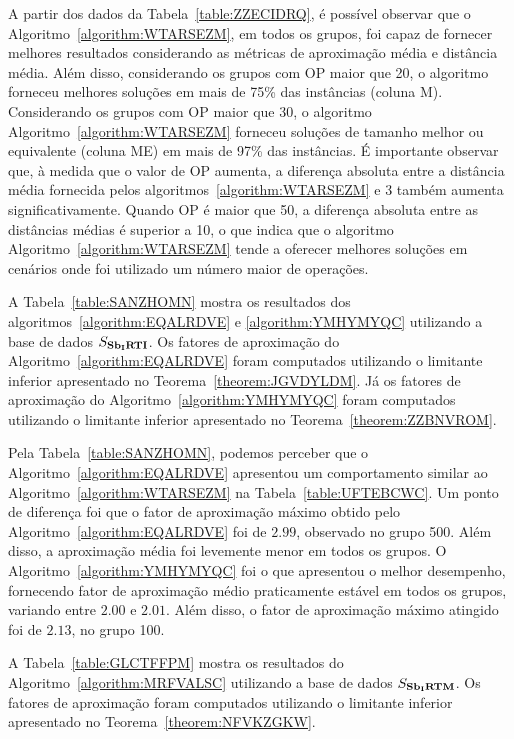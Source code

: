 

A partir dos dados da Tabela~\ref{table:ZZECIDRQ}, é possível observar que o Algoritmo~\ref{algorithm:WTARSEZM}, em todos os grupos, foi capaz de fornecer melhores resultados considerando as métricas de aproximação média e distância média. Além disso, considerando os grupos com OP maior que 20, o algoritmo forneceu melhores soluções em mais de 75\% das instâncias (coluna M). Considerando os grupos com OP maior que 30, o algoritmo Algoritmo~\ref{algorithm:WTARSEZM} forneceu soluções de tamanho melhor ou equivalente (coluna ME) em mais de 97\% das instâncias. É importante observar que, à medida que o valor de OP aumenta, a diferença absoluta entre a distância média fornecida pelos algoritmos~\ref{algorithm:WTARSEZM} e 3\SbIRT{} também aumenta significativamente. Quando OP é maior que 50, a diferença absoluta entre as distâncias médias é superior a 10, o que indica que o algoritmo Algoritmo~\ref{algorithm:WTARSEZM} tende a oferecer melhores soluções em cenários onde foi utilizado um número maior de operações.

A Tabela~\ref{table:SANZHOMN} mostra os resultados dos algoritmos~\ref{algorithm:EQALRDVE} e \ref{algorithm:YMHYMYQC} utilizando a base de dados $S_{\textbf{Sb\textsubscript{I}RTI}}{}$. Os fatores de aproximação do Algoritmo~\ref{algorithm:EQALRDVE} foram computados utilizando o limitante inferior apresentado no Teorema~\ref{theorem:JGVDYLDM}. Já os fatores de aproximação do Algoritmo~\ref{algorithm:YMHYMYQC} foram computados utilizando o limitante inferior apresentado no Teorema~\ref{theorem:ZZBNVROM}.



Pela Tabela~\ref{table:SANZHOMN}, podemos perceber que o Algoritmo~\ref{algorithm:EQALRDVE} apresentou um comportamento similar ao Algoritmo~\ref{algorithm:WTARSEZM} na Tabela~\ref{table:UFTEBCWC}. Um ponto de diferença foi que o fator de aproximação máximo obtido pelo Algoritmo~\ref{algorithm:EQALRDVE} foi de $2.99$, observado no grupo 500. Além disso, a aproximação média foi levemente menor em todos os grupos. O Algoritmo~\ref{algorithm:YMHYMYQC} foi o que apresentou o melhor desempenho, fornecendo fator de aproximação médio praticamente estável em todos os grupos, variando entre $2.00$ e $2.01$. Além disso, o fator de aproximação máximo atingido foi de $2.13$, no grupo 100.

A Tabela~\ref{table:GLCTFFPM} mostra os resultados do Algoritmo~\ref{algorithm:MRFVALSC} utilizando a base de dados $S_{\textbf{Sb\textsubscript{I}RTM}}{}$. Os fatores de aproximação foram computados utilizando o limitante inferior apresentado no Teorema~\ref{theorem:NFVKZGKW}.

